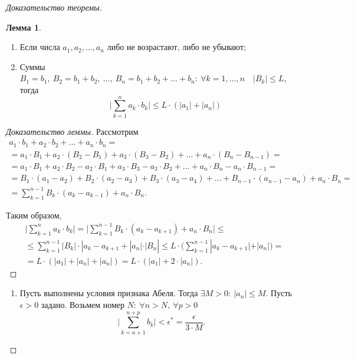 \documentclass{report}
\theoremstyle{definition}
\newtheorem{lemma}{Лемма}[section]
\begin{document}
\begin{proof}[Доказательство теоремы]
  \begin{lemma}
    \begin{enumerate}
      \item Если числа $a_1,a_2,\ldots,a_n$ либо не возрастают, либо не убывают;
      \item Суммы $B_1 = b_1, \ B_2 = b_1 + b_2, \ \ldots, \ B_n = b_1 + b_2 + \ldots + b_n: \ \forall k = 1,\ldots,n \quad |B_k| \leqslant L$, тогда
            \begin{equation}
              \quad \bigg|\sum_{k=1}^{n} a_k \cdot b_k \bigg| \leqslant L\cdot (|a_1| + |a_n|)
            \end{equation}
    \end{enumerate}
  \end{lemma}

  \begin{proof}[Доказательство леммы]
    Рассмотрим
    \begin{multline*}
      a_1 \cdot b_1 + a_2 \cdot b_2 + \ldots + a_n \cdot b_n = \\
      = a_1 \cdot B_1 + a_2 \cdot (B_2 - B_1) + a_3 \cdot (B_3 - B_2) + \ldots + a_n \cdot (B_n - B_{n-1}) = \\
      = a_1 \cdot B_1 + a_2 \cdot B_2 - a_2 \cdot B_1 + a_3\cdot B_3 - a_3 \cdot B_2 + \ldots + a_n \cdot B_n - a_n \cdot B_{n-1} = \\
      = B_1\cdot (a_1 - a_2) + B_2\cdot (a_2 - a_3) + B_3 \cdot (a_3 - a_4) + \ldots + B_{n-1} \cdot (a_{n-1} - a_n) + a_n \cdot B_n = \\
      = \sum_{k=1}^{n-1} B_k \cdot (a_k - a_{k-1}) + a_n \cdot B_n.
    \end{multline*}

    Таким образом,
    \begin{multline*}
      \bigg|\sum_{k=1}^{n}a_k\cdot b_k \bigg| = \bigg|\sum_{k=1}^{n-1} B_k \cdot (a_k - a_{k+1}) + a_n \cdot B_n\bigg| \leqslant \\
      \leqslant \sum_{k=1}^{n-1}|B_k| \cdot |a_k - a_{k+1} + |a_n| \cdot |B_n| \leqslant L\cdot \bigg(\sum_{k=1}^{n-1}|a_k - a_{k+1}| + |a_n|\bigg) = \\
      = L\cdot (|a_1| + |a_n| + |a_n|) = L\cdot (|a_1| + 2\cdot |a_n|).
    \end{multline*}
  \end{proof}

  \begin{enumerate}
    \item Пусть выполнены условия признака Абеля. Тогда $\exists M > 0: \ |a_n| \leqslant M$. Пусть $\epsilon > 0$ задано. Возьмем номер $N: \ \forall n > N, \ \forall p > 0$
          \begin{equation*}
            \bigg|\sum_{k=n+1}^{n+p}b_k\bigg| < \epsilon^* = \frac{\epsilon}{3\cdot M}.
          \end{equation*}


\end{enumerate}
\end{proof}
\end{document}
